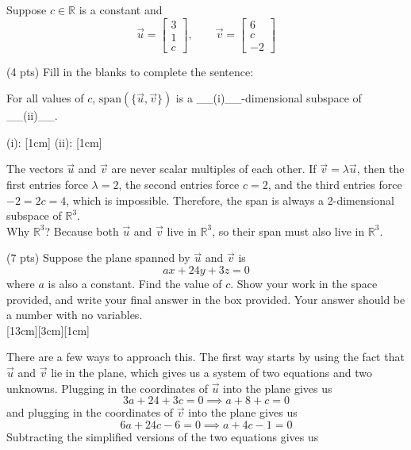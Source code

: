 \documentclass[11pt]{article}
\begin{document}
\begin{prob}[(11 pts)]
Suppose $c \in \mathbb R$ is a constant and
\[
\vec u=\begin{bmatrix}3\\1\\c\end{bmatrix},
\qquad
\vec v=\begin{bmatrix}6\\c\\-2\end{bmatrix}
\]

\begin{subprob}(4 pts)
Fill in the blanks to complete the sentence:

\begin{center}For all values of $c$, $\text{span}(\{\vec u,\vec v\})$ is a \_\_(i)\_\_-dimensional subspace of \_\_(ii)\_\_.\end{center}

(i): [1cm] \hspace{0.5in} (ii): [1cm]
\begin{solution}
The vectors $\vec u$ and $\vec v$ are never scalar multiples of each other. If $\vec v=\lambda\vec u$, then the first entries force $\lambda=2$, the second entries force $c=2$, and the third entries force $-2=2c=4$, which is impossible. Therefore, the span is always a 2-dimensional subspace of $\mathbb R^3$. \\

Why $\mathbb R^3$? Because both $\vec u$ and $\vec v$ live in $\mathbb R^3$, so their span must also live in $\mathbb R^3$.
\end{solution}
\end{subprob}

\begin{subprob}(7 pts) Suppose the plane spanned by $\vec u$ and $\vec v$ is
\[
ax+24y+3z=0
\]
where $a$ is also a constant. Find the value of $c$. Show your work in the space provided, and write your final answer in the box provided. Your answer should be a number with no variables. \\

[13cm][3cm][1cm]

\begin{solution}
There are a few ways to approach this. The first way starts by using the fact that $\vec u$ and $\vec v$ lie in the plane, which gives us a system of two equations and two unknowns. Plugging in the coordinates of $\vec u$ into the plane gives us
\[
3a+24+3c=0 \implies a + 8 + c = 0
\]
and plugging in the coordinates of $\vec v$ into the plane gives us
\[
6a+24c-6=0 \implies a + 4c - 1 = 0
\]
Subtracting the simplified versions of the two equations gives us


\end{solution}
\end{subprob}
\end{prob}
\end{document}
